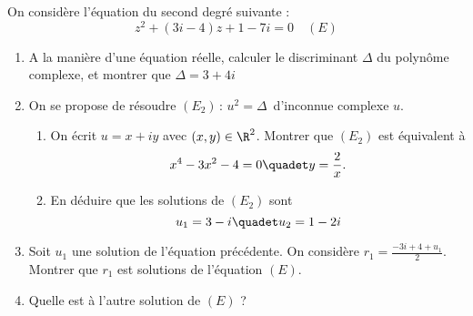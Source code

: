 




\begin{exercice}
On considère l'équation du second degré suivante : 
$$z^2+(3i-4)z+1-7i=0 \quad (E) $$

\begin{enumerate}
\item A la manière d'une équation réelle, calculer le discriminant $\Delta$ du polynôme complexe, et montrer que $\Delta=3+4i$
\item On se propose de résoudre $ (E_2) \, : \, u^2=\Delta \, $  d'inconnue complexe $u$. 
\begin{enumerate}
\item On écrit $u=x+iy$ avec $(x,y)\in \R^2$. Montrer que $(E_2)$ est équivalent à 
$$ x^4-3x^2-4=0 \quadet y =\frac{2}{x}.$$
\item En déduire que les solutions de $(E_2)$ sont 
$$u_1=3-i\quadet u_2=1-2i$$
\end{enumerate}
\item Soit $u_1$ une solution de l'équation précédente. 
On considère $r_1 = \frac{-3i+4 +u_1}{2}$. Montrer que $r_1$ est solutions de l'équation  $(E)$.
\item Quelle est à l'autre solution  de  $(E)$ ? 
\end{enumerate}

\end{exercice}

